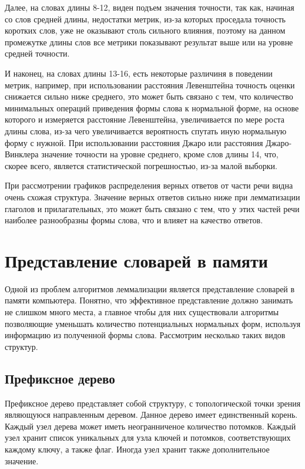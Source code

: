 \documentclass[12pt, a4paper]{article}
\begin{document}
Далее, на словах длины 8-12, виден подъем значения точности, так как, начиная со слов  средней длины, недостатки метрик, из-за которых проседала точность коротких слов, уже не оказывают столь сильного влияния, поэтому на данном промежутке длины слов все метрики показывают результат выше или на уровне средней точности.

И наконец, на словах длины 13-16, есть некоторые различиня в поведении метрик, например, при использовании расстояния Левенштейна точность оценки снижается сильно ниже среднего, это может быть связано с тем, что количество минимальных операций приведения формы слова к нормальной форме, на основе которого и измеряется расстояние Левенштейна, увеличивается по мере роста длины слова, из-за чего увеличивается вероятность спутать иную нормальную форму с нужной. При использовании расстояния Джаро или расстояния Джаро-Винклера значение точности на уровне среднего, кроме слов длины 14, что, скорее всего, является статистической погрешностью, из-за малой выборки.

\newpage

При рассмотрении графиков распределения верных ответов от части речи видна очень схожая структура. Значение верных ответов сильно ниже при лемматизации глаголов и прилагательных, это может быть связано с тем, что у этих частей речи наиболее разнообразны формы слова, что и влияет на качество ответов.

\section{Представление словарей в памяти}
\quad Одной из проблем алгоритмов леммализации является представление словарей в памяти компьютера. Понятно, что эффективное представление должно занимать не слишком много места, а главное чтобы для них существовали алгоритмы позволяющие уменьшать количество потенциальных нормальных форм, используя информацию из полученной формы слова. Рассмотрим несколько таких видов структур.

\subsection{Префиксное дерево}
\quad Префиксное дерево представляет собой структуру, с топологической точки зрения являющуюся направленным деревом. Данное дерево имеет единственный корень. Каждый узел дерева может иметь неогранниченое количество потомков. Каждый узел хранит список уникальных для узла ключей и потомков, соответствующих каждому ключу, а также флаг. Иногда узел хранит также дополнительное значение.
\end{document}
